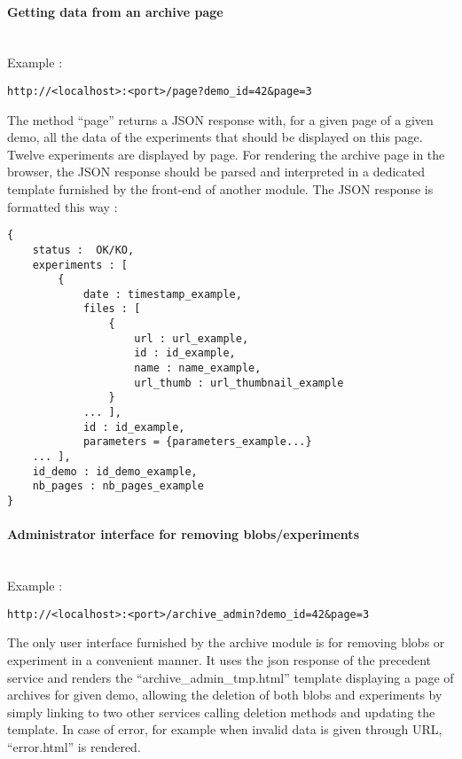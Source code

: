 \paragraph{Getting data  from an archive page} \hspace{0pt} \\
Example :
\begin{verbatim}
http://<localhost>:<port>/page?demo_id=42&page=3
\end{verbatim}
The method ``page'' returns a JSON response with, for a given page of a given demo, all the data of the experiments that should be displayed on this page. Twelve experiments are displayed by page. For rendering the archive page in the browser, the JSON response should be parsed and interpreted in a dedicated template furnished by the front-end of another module. The JSON response is formatted this way : 
\begin{verbatim}
{
    status :  OK/KO,
    experiments : [
        {
            date : timestamp_example, 
            files : [
                {
                    url : url_example,
                    id : id_example,
                    name : name_example,
                    url_thumb : url_thumbnail_example
                }
            ... ],
            id : id_example,
            parameters = {parameters_example...}
    ... ],
    id_demo : id_demo_example,
    nb_pages : nb_pages_example
}
\end{verbatim} 

\paragraph{Administrator interface for removing blobs/experiments} \hspace{0pt} \\
Example :
\begin{verbatim}
http://<localhost>:<port>/archive_admin?demo_id=42&page=3
\end{verbatim}
The only user interface furnished by the archive module is for removing blobs or experiment in a convenient manner. It uses the json response of the precedent service and renders the ``archive\_admin\_tmp.html'' template displaying a page of archives for given demo, allowing the deletion of both blobs and experiments by simply linking to two other services calling deletion methods and updating the template. In case of error, for example when invalid data is given through URL, ``error.html'' is rendered.

